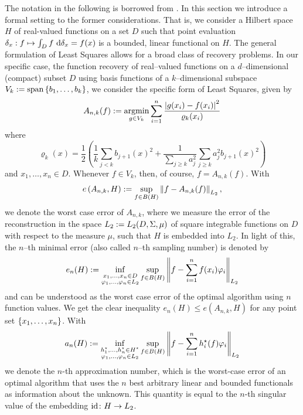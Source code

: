 \documentclass[12pt, oneside]{amsart}
\theoremstyle{definition}
\theoremstyle{remark}
\numberwithin{equation}{section}
\begin{document}
The notation in the following is borrowed from \cite{Ullrich_2020}.
In this section we introduce a formal setting to the former considerations. That is, we consider a Hilbert space \(H\) of real-valued functions on a set \(D\) such that point evaluation \(\delta_x: f \mapsto \int_D f\ \d \delta_x = f(x)\)
is a bounded, linear functional on \(H\).
The general formulation of Least Squares allows for a broad class of recovery 
problems. In our specific case, the function recovery of real--valued functions 
on a \(d\)--dimensional (compact) subset \(D\) using basis functions of a 
\(k\)--dimensional subspace \(V_k \defn \spn \set{b_1, \dots, b_k}\), we 
consider the specific form of Least Squares, given by\[
    A_{n, k}(f) \defn \argmin_{g \in V_k} \sum_{i=1}^n \frac{\abs{g(x_i) - f(x_i)}^2}{\varrho_k(x_i)}
\]
where \[
    \varrho_k(x) = \frac{1}{2} \left( \frac{1}{k} \sum_{j < k} b_{j+1}(x)^2 + \frac{1}{\sum_{j \geq k} a_j^2} \sum_{j \geq k} a_j^2 b_{j+1}(x)^2 \right)
\]
and \(x_1, \dots, x_n \in D\). Whenever \(f \in V_k\), then, of course, \(f = A_{n, k}(f)\). With
\begin{equation}\label{eq:worstCaseError}
    e\left(A_{n,k}, H\right) \defn \sup_{f \in B(H)} \norm[L_2]{f - A_{n,k}(f)},
\end{equation}
we denote the worst case error of \(A_{n,k}\), where we measure the error of the reconstruction in the space \(L_2 \defn L_2(D, \Sigma, \mu)\) of square integrable functions on \(D\) with respect to the measure \(\mu\), such that \(H\) is embedded into \(L_2\). In light of this, the \(n\)--th minimal error (also called \(n\)--th sampling number) is denoted by \[
    e_n(H) \defn \inf_{\substack{x_1, \dots, x_n \in D \\ \phi_1, \dots, \phi_n 
    \in L_2}} \sup_{f \in B(H)} \norm[L_2]{f - \sum_{i=1}^n f(x_i) \phi_i}
\]
and can be understood as the worst case error of the optimal algorithm using \(n\) function values. We get the clear inequality \(e_n(H) \leq e(A_{n,k}, H)\) for any point set \(\set{x_1, \dots, x_n}\). With \[
    a_n(H) \defn \inf_{\substack{h_1^\star, \dots, h_n^\star \in H^\star \\ 
    \phi_1, \dots, \phi_n \in L_2}} \sup_{f \in B(H)} \norm[L_2]{f - 
    \sum_{i=1}^n h_i^\star(f) \phi_i}
\]
we denote the \(n\)-th approximation number, which is the worst-case error of 
an optimal algorithm that uses the \(n\) best arbitrary linear and bounded 
functionals as information about the unknown. This quantity is equal to the 
\(n\)-th singular value of the embedding \(\id\from H \to L_2\).
\end{document}
